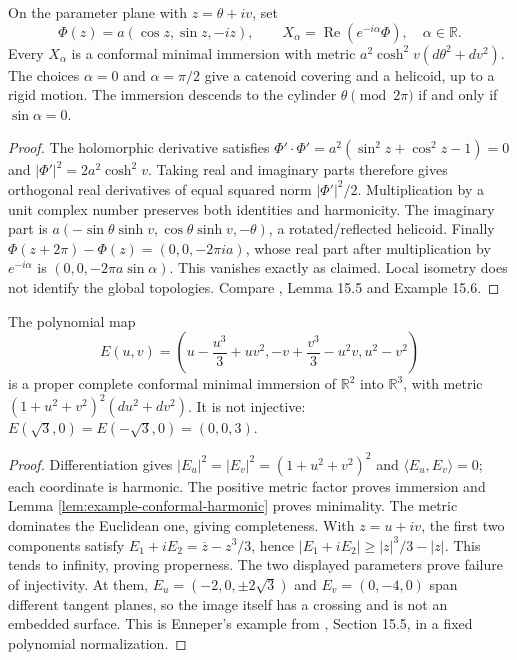 \begin{proposition}\label{prop:catenoid-helicoid-associate}
On the parameter plane with $z=\theta+iv$, set
\[
 \Phi(z)=a(\cos z,\sin z,-iz),\qquad
 X_\alpha=\operatorname{Re}(e^{-i\alpha}\Phi),\quad\alpha\in\mathbb R.
\]
Every $X_\alpha$ is a conformal minimal immersion with metric $a^2\cosh^2v(d\theta^2+dv^2)$. The choices $\alpha=0$ and $\alpha=\pi/2$ give a catenoid covering and a helicoid, up to a rigid motion. The immersion descends to the cylinder $\theta\pmod{2\pi}$ if and only if $\sin\alpha=0$.
\end{proposition}
\begin{proof}
The holomorphic derivative satisfies $\Phi'\cdot\Phi'=a^2(\sin^2z+\cos^2z-1)=0$ and $|\Phi'|^2=2a^2\cosh^2v$. Taking real and imaginary parts therefore gives orthogonal real derivatives of equal squared norm $|\Phi'|^2/2$. Multiplication by a unit complex number preserves both identities and harmonicity. The imaginary part is $a(-\sin\theta\sinh v,\cos\theta\sinh v,-\theta)$, a rotated/reflected helicoid. Finally $\Phi(z+2\pi)-\Phi(z)=(0,0,-2\pi ia)$, whose real part after multiplication by $e^{-i\alpha}$ is $(0,0,-2\pi a\sin\alpha)$. This vanishes exactly as claimed. Local isometry does not identify the global topologies. Compare \cite{ChMin}, Lemma 15.5 and Example 15.6.
\end{proof}

\begin{example}\label{ex:explicit-enneper}
The polynomial map
\[
 E(u,v)=\left(u-\frac{u^3}{3}+uv^2,
 -v+\frac{v^3}{3}-u^2v,u^2-v^2\right)
\]
is a proper complete conformal minimal immersion of $\mathbb R^2$ into $\mathbb R^3$, with metric $(1+u^2+v^2)^2(du^2+dv^2)$. It is not injective: $E(\sqrt3,0)=E(-\sqrt3,0)=(0,0,3)$.
\end{example}
\begin{proof}
Differentiation gives $|E_u|^2=|E_v|^2=(1+u^2+v^2)^2$ and $\langle E_u,E_v\rangle=0$; each coordinate is harmonic. The positive metric factor proves immersion and Lemma \ref{lem:example-conformal-harmonic} proves minimality. The metric dominates the Euclidean one, giving completeness. With $z=u+iv$, the first two components satisfy $E_1+iE_2=\overline z-z^3/3$, hence $|E_1+iE_2|\geq |z|^3/3-|z|$. This tends to infinity, proving properness. The two displayed parameters prove failure of injectivity. At them, $E_u=(-2,0,\pm2\sqrt3)$ and $E_v=(0,-4,0)$ span different tangent planes, so the image itself has a crossing and is not an embedded surface. This is Enneper's example from \cite{ChMin}, Section 15.5, in a fixed polynomial normalization.
\end{proof}

